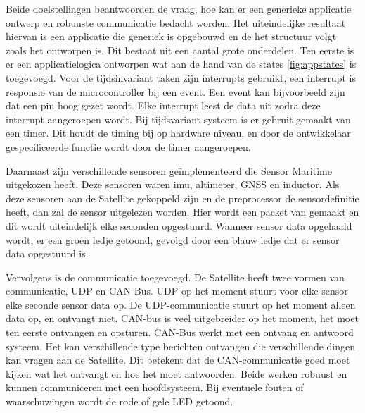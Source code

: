 \noindent Beide doelstellingen beantwoorden de vraag, hoe kan er een generieke applicatie ontwerp en robuuste communicatie bedacht worden. Het uiteindelijke resultaat hiervan is een applicatie die generiek is opgebouwd en de het structuur volgt zoals het ontworpen is. Dit bestaat uit een aantal grote onderdelen. Ten eerste is er een applicatielogica ontworpen wat aan de hand van de states \ref{fig:appstates} is toegevoegd. Voor de tijdsinvariant taken zijn interrupts gebruikt, een interrupt is responsie van de microcontroller bij een event. Een event kan bijvoorbeeld zijn dat een pin hoog gezet wordt. Elke interrupt leest de data uit zodra deze interrupt aangeroepen wordt. Bij tijdsvariant systeem is er gebruit gemaakt van een timer. Dit houdt de timing bij op hardware niveau, en door de ontwikkelaar gespecificeerde functie wordt door de timer aangeroepen. \newline

\noindent Daarnaast zijn verschillende sensoren geïmplementeerd die Sensor Maritime uitgekozen heeft. Deze sensoren waren imu, altimeter, GNSS en inductor. Als deze sensoren aan de Satellite gekoppeld zijn en de preprocessor de sensordefinitie heeft, dan zal de sensor uitgelezen worden. Hier wordt een packet van gemaakt en dit wordt uiteindelijk elke seconden opgestuurd. Wanneer sensor data opgehaald wordt, er een groen ledje getoond, gevolgd door een blauw ledje dat er sensor data opgestuurd is. \newline

\noindent Vervolgens is de communicatie toegevoegd. De Satellite heeft twee vormen van communicatie, UDP en CAN-Bus. UDP op het moment stuurt voor elke sensor elke seconde sensor data op. De UDP-communicatie stuurt op het moment alleen data op, en ontvangt niet. CAN-bus is veel uitgebreider op het moment, het moet ten eerste ontvangen en opsturen. CAN-Bus werkt met een ontvang en antwoord systeem. Het kan verschillende type berichten ontvangen die verschillende dingen kan vragen aan de Satellite. Dit betekent dat de CAN-communicatie goed moet kijken wat het ontvangt en hoe het moet antwoorden. Beide werken robuust en kunnen communiceren met een hoofdsysteem. Bij eventuele fouten of waarschuwingen wordt de rode of gele LED getoond. 

\newpage
